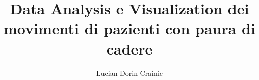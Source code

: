 \documentclass[binding=0.6cm]{sapthesis}
\title{Data Analysis e Visualization dei movimenti di pazienti con paura di cadere}
\author{Lucian Dorin Crainic}
\begin{document}
\lstset{language=Python}

\frontmatter

\maketitle
\cleardoublepage

\dedication{Audentes Fortuna iuvat \\ \emph{Virgilio, Eneide, X, 284}}



\cleardoublepage

\tableofcontents
\cleardoublepage

\mainmatter


















\end{document}
